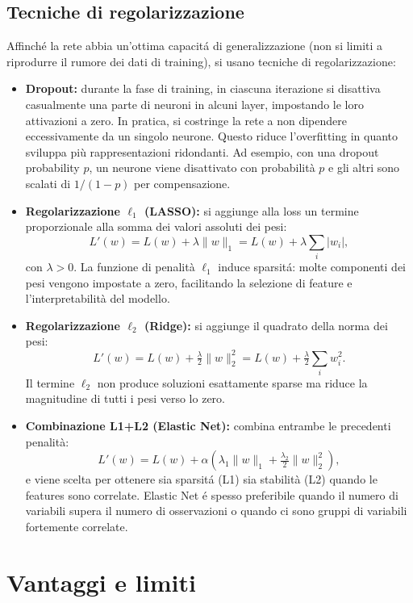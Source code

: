 \documentclass[a4paper,12pt]{report}
\begin{document}
	\subsection{Tecniche di regolarizzazione}
	Affinché la rete abbia un'ottima capacitá di generalizzazione (non si limiti a riprodurre il rumore dei dati di training), si usano tecniche di regolarizzazione:
	\begin{itemize}
		\item \textbf{Dropout:} durante la fase di training, in ciascuna iterazione si disattiva casualmente una parte di neuroni in alcuni layer, impostando le loro attivazioni a zero. In pratica, si costringe la rete a non dipendere eccessivamente da un singolo neurone. Questo riduce l'overfitting in quanto sviluppa più rappresentazioni ridondanti. Ad esempio, con una dropout probability $p$, un neurone viene disattivato con probabilità $p$ e gli altri sono scalati di $1/(1-p)$ per compensazione.
		\item \textbf{Regolarizzazione \(\ell_1\) (LASSO):} si aggiunge alla loss un termine proporzionale alla somma dei valori assoluti dei pesi:
		\[
		L'(w)=L(w) + \lambda \|w\|_1 = L(w) + \lambda\sum_i |w_i|,
		\]
		con $\lambda>0$. La funzione di penalità \(\ell_1\) induce sparsitá: molte componenti dei pesi vengono impostate a zero, facilitando la selezione di feature e l'interpretabilità del modello.
		\item \textbf{Regolarizzazione \(\ell_2\) (Ridge):} si aggiunge il quadrato della norma dei pesi:
		\[
		L'(w)=L(w) + \tfrac{\lambda}{2}\|w\|_2^2 = L(w) + \tfrac{\lambda}{2}\sum_i w_i^2.
		\]
		Il termine $\ell_2$ non produce soluzioni esattamente sparse ma riduce la magnitudine di tutti i pesi verso lo zero.
		\item \textbf{Combinazione L1+L2 (Elastic Net):} combina entrambe le precedenti penalità:
		\[
		L'(w)=L(w) + \alpha\left(\lambda_1\|w\|_1 + \tfrac{\lambda_2}{2}\|w\|_2^2\right),
		\]
		e viene scelta per ottenere sia sparsitá (L1) sia stabilità (L2) quando le features sono correlate. Elastic Net é spesso preferibile quando il numero di variabili supera il numero di osservazioni o quando ci sono gruppi di variabili fortemente correlate.
	\end{itemize}
	
	\section{Vantaggi e limiti}
	
\end{document}
